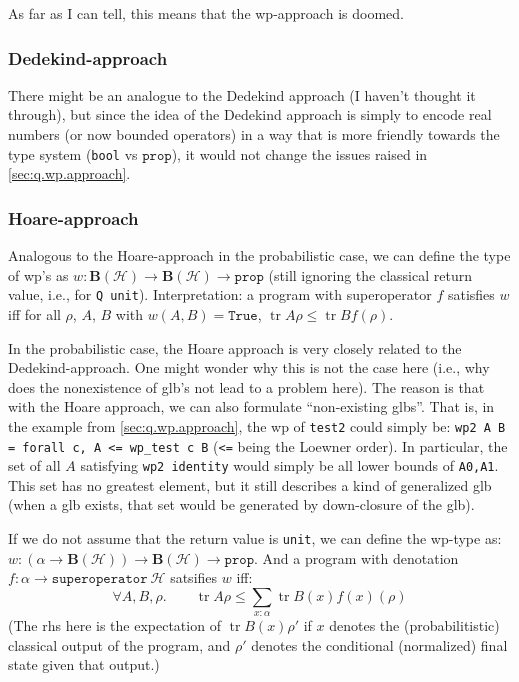 \documentclass[a4paper]{article}
\newcommand\prop{\mathtt{prop}}
\newcommand\calH{\mathcal H}
\newcommand\bpos{\mathbf B(\calH)}
\DeclareMathOperator\tr{tr}
\begin{document}
As far as I can tell, this means that the wp-approach is doomed.

\subsubsection{Dedekind-approach}

There might be an analogue to the Dedekind approach (I haven't thought it through), but since the idea of the Dedekind approach is simply to encode real numbers (or now bounded operators) in a way that is more friendly towards the type system (\texttt{bool} vs $\prop$), it would not change the issues raised in 
\autoref{sec:q.wp.approach}.

\subsubsection{Hoare-approach}

Analogous to the Hoare-approach in the probabilistic case, we can define the type of wp's as $w:\bpos\to\bpos\to\prop$
(still ignoring the classical return value, i.e., for \texttt{Q unit}).
Interpretation: a program with superoperator $f$ satisfies $w$ iff for all $\rho$, $A$, $B$ with $w(A,B)=\mathtt{True}$, $\tr A\rho\leq \tr B f(\rho)$.

In the probabilistic case, the Hoare approach is very closely related to the Dedekind-approach. One might wonder why this is not the case here (i.e., why does the nonexistence of glb's not lead to a problem here).
The reason is that with the Hoare approach, we can also formulate ``non-existing glbs''.
That is, in the example from \autoref{sec:q.wp.approach}, the wp of \texttt{test2} could simply be:
\texttt{wp2 A B = forall c, A <= wp\_test c B} (\texttt{<=} being the Loewner order).
In particular, the set of all $A$ satisfying \texttt{wp2 identity} would simply be all lower bounds of \texttt{A0,A1}.
This set has no greatest element, but it still describes a kind of generalized glb (when a glb exists, that set would be generated by down-closure of the glb).

If we do not assume that the return value is \texttt{unit}, we can define the wp-type as:
$w:(\alpha\to\bpos)\to\bpos\to\prop$.
And a program with denotation $f:\alpha\to\mathtt{superoperator}\ \calH$ satsifies $w$ iff:
\[
  \forall A,B,\rho.\qquad
  \tr A\rho
  \leq
  \sum_{x:\alpha}
  \tr B(x)f(x)(\rho)
\]
(The rhs here is the expectation of $\tr B(x)\rho'$ if $x$ denotes the (probabilitistic) classical output of the program, and $\rho'$ denotes the conditional (normalized) final state given that output.)
\end{document}
